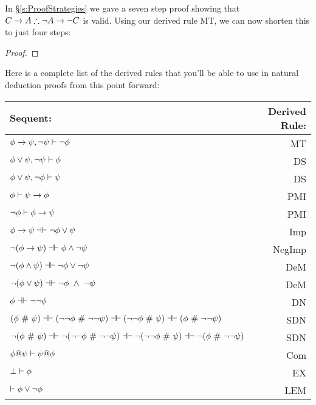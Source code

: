 In  \S\ref{s:ProofStrategies} we gave a seven step proof showing that $C \rightarrow A \therefore \neg A \rightarrow \neg C$ is valid.  Using our derived rule MT, we can now shorten this to just four steps:

\begin{proof}
  
\open
	 
	 
\close
{} 
\end{proof}
Here is a complete list of the derived rules that you'll be able to use in natural deduction proofs from this point forward:

\begin{center}
\begin{tabular}{l  r}
\textbf{Sequent:}                    &       \textbf{Derived Rule:} \\ \hline
$\mathcal{\phi} \rightarrow \mathcal{\psi},  \neg\mathcal{\psi} \vdash \neg \mathcal{\phi}$   &                       MT  \\
$\mathcal{\phi} \vee \mathcal{\psi},  \neg\mathcal{\psi} \vdash \mathcal{\phi}$ & DS\\
$\mathcal{\phi} \vee \mathcal{\psi},  \neg\mathcal{\phi}\vdash \mathcal{\psi}$    &      DS  \\
$\mathcal{\phi} \vdash\mathcal{\psi} \rightarrow \mathcal{\phi}$  &              PMI  \\
$\neg\mathcal{\phi}\vdash\mathcal{\phi}\rightarrow \mathcal{\psi}$  & PMI\\
$\meta{\phi} \rightarrow\meta{\psi} \pequiv \enot\meta{\phi}\eor \meta{\psi}$  &                   Imp   \\
$\enot (\meta{\phi} \rightarrow \meta{\psi}) \pequiv \meta{\phi} \eand \enot \meta{\psi}$  &               NegImp  \\
$\enot (\meta{\phi} \eand \meta{\psi})  \pequiv \enot\meta{\phi}\eor \enot \meta{\psi}$  &                DeM  \\
$\enot (\meta{\phi} \eor \meta{\psi}) \pequiv \enot\meta{\phi}\ \eand \ \enot \meta{\psi}$   &               DeM  \\
$\meta{\phi} \pequiv \enot \enot \meta{\phi}$     &                              DN  \\
$(\meta{\phi}  \ \#\  \meta{\psi}) \pequiv (\enot \enot \meta{\phi}  \ \#\   \enot \enot \meta{\psi}) \pequiv (\enot \enot \meta{\phi}  \ \#\  \meta{\psi}) \pequiv (\meta{\phi}  \ \#\  \enot \enot  \meta{\psi})$ & SDN\\
$\enot (\meta{\phi}  \ \#\  \meta{\psi}) \pequiv \enot (\enot \enot \meta{\phi}  \ \#\   \enot \enot \meta{\psi}) \pequiv \enot (\enot \enot \meta{\phi}  \ \#\  \meta{\psi}) \pequiv \enot (\meta{\phi}  \ \#\  \enot \enot  \meta{\psi})$ & SDN\\
$\mathcal{\phi} @ \mathcal{\psi}  \vdash  \mathcal{\psi} @ \mathcal{\phi}$ &                          Com \\
$\bot \vdash \mathcal{\phi}$ & EX \\
 $\vdash \mathcal{\phi}\vee \neg \mathcal{\phi}$ &                                                    LEM \\
\end{tabular}
\end{center}

